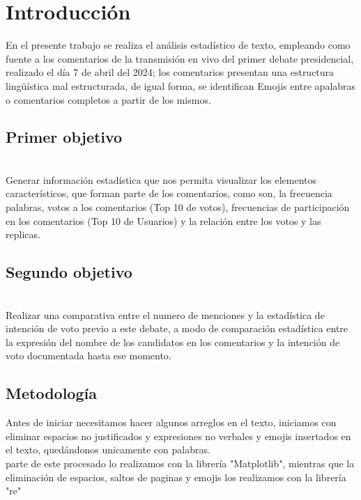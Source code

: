 \chapter{Introducción}

En el presente trabajo se realiza el análisis estadístico de texto, empleando como fuente a los comentarios de la transmisión en vivo del primer debate presidencial, realizado el día 7 de abril del 2024; los comentarios presentan una estructura lingüística mal estructurada, de igual forma, se identifican Emojis entre apalabras o comentarios completos a partir de los mismos.\\


\section{Primer objetivo}\\
 Generar información estadística que nos permita visualizar los elementos característicos, que forman parte de los comentarios, como son, la frecuencia palabras, votos a los comentarios (Top 10 de votos), frecuencias de participación en los comentarios (Top 10 de Usuarios) y la relación entre los votos y las replicas.\\

\section{Segundo objetivo}\\
 Realizar una comparativa entre el numero de menciones y la estadística de intención de voto previo a este debate, a modo de comparación estadística entre la expresión del nombre de los candidatos en los comentarios y la intención de voto documentada hasta ese momento.\\
   
\section{Metodología}

Antes de iniciar necesitamos hacer algunos arreglos en el texto, iniciamos con eliminar espacios no justificados y expresiones no verbales y emojis insertados en el texto, quedándonos unicamente con palabras.\\

parte de este procesado lo realizamos con la librería "Matplotlib", mientras que la eliminación de espacios, saltos de paginas y emojis los realizamos con la librería "re"


